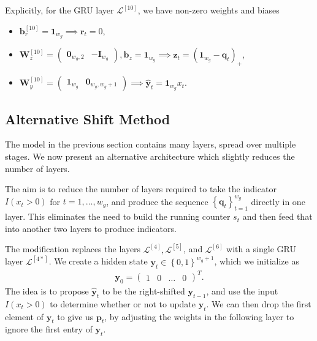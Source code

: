 \documentclass{somasmsc}
\begin{document}
Explicitly, for the GRU layer $\mathcal{L}^{\left[10\right]}$, we have non-zero weights and biases

\begin{itemize}
    \item $\pmb{b}^{\left[10\right]}_r = \mathbf{1}_{w_g} \implies \pmb{r}_t = 0$,
    \item $\mathbf{W}^{\left[10\right]}_z =
    \begin{pmatrix}
        \mathbf{0}_{w_g,2} & -\mathbf{I}_{w_g}
    \end{pmatrix}, \pmb{b}_z = \mathbf{1}_{w_g} \implies \pmb{z}_t = \left(\mathbf{1}_{w_g} - \pmb{q}_t\right)_+$,
    \item $\mathbf{W}^{\left[10\right]}_y =
    \begin{pmatrix}
        \mathbf{1}_{w_g} & \mathbf{0}_{w_g, w_g+1}
    \end{pmatrix} \implies \hat{\pmb{y}}_t = \mathbf{1}_{w_g} x_t$.
\end{itemize}

\subsection{Alternative Shift Method}\label{letters:alt}

The model in the previous section contains many layers, spread over multiple stages. We now present an alternative architecture which slightly reduces the number of layers.

The aim is to reduce the number of layers required to take the indicator $I(x_t > 0)$ for $t=1, \dots, w_g$, and produce the sequence $\left\{\pmb{q}_t\right\}_{t=1}^{w_g}$ directly in one layer. This eliminates the need to build the running counter $s_t$ and then feed that into another two layers to produce indicators.

The modification replaces the layers $\mathcal{L}^{\left[4\right]}, \mathcal{L}^{\left[5\right]}$, and $\mathcal{L}^{\left[6\right]}$ with a single GRU layer $\mathcal{L}^{\left[4*\right]}$. We create a hidden state $\pmb{y}_t \in \left\{0, 1\right\}^{w_g+1}$, which we initialize as
\begin{align*}
\pmb{y}_0 =
\begin{pmatrix}
    1 & 0 & \dots & 0
\end{pmatrix}^T.
\end{align*}
The idea is to propose $\hat{\pmb{y}}_t$ to be the right-shifted $\pmb{y}_{t-1}$, and use the input $I(x_t > 0)$ to determine whether or not to update $\pmb{y}_t$. We can then drop the first element of $\pmb{y}_t$ to give us $\pmb{p}_t$, by adjusting the weights in the following layer to ignore the first entry of $\pmb{y}_t$.
\end{document}
